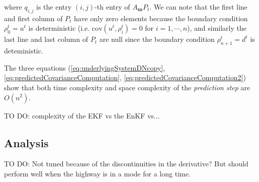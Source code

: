 \noindent where $q_{i,j}$ is the entry $(i,j)$-th entry of $A_{\boldsymbol m}P_{t}$. We can note that the first line and first column of $P_{t}$ have only zero elements because the boundary condition $\rho^{t}_{0}=u^{t}$ is deterministic (i.e. $\text{cov}(u^{t},\rho^{t}_{i})=0$ for $i=1,\cdots,n$), and similarly the last line and last column of $P_{t}$ are null since the boundary condition $\rho^{t}_{n+1}=d^{t}$ is deteministic.

The three equations (\ref{eq:underlyingSystemDNcopy}, \ref{eq:predictedCovarianceComputation}, \ref{eq:predictedCovarianceComputation2}) show that both time complexity and space complexity of the \textit{prediction step} are $O(n^{2})$.

TO DO: complexity of the EKF vs the EnKF vs...

\subsection{Analysis}

TO DO: Not tuned because of the discontinuities in the derivative? But should perform well when the highway is in a mode for a long time.
